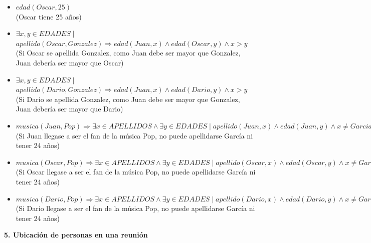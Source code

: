 \documentclass[12pt]{article}
\begin{document}
\begin{itemize}
\begin{itemize}
\item $edad(Oscar, 25)$ \\ (Oscar tiene 25 años)
\item $\exists x,y \in EDADES \mid$ \\ $ apellido(Oscar, Gonzalez) \Rightarrow edad(Juan,x) \land edad(Oscar,y) \land x > y$ \\ (Si Oscar se apellida Gonzalez, como Juan debe ser mayor que Gonzalez, Juan debería ser mayor que Oscar)
\item $\exists x,y \in EDADES \mid$ \\ $ apellido(Dario, Gonzalez) \Rightarrow edad(Juan,x) \land edad(Dario,y) \land x > y$ \\ (Si Dario se apellida Gonzalez, como Juan debe ser mayor que Gonzalez, Juan debería ser mayor que Dario)
\item $musica(Juan, Pop) \Rightarrow \exists x \in APELLIDOS \land \exists y \in EDADES \mid apellido(Juan, x) \land edad(Juan, y) \land x \neq Garcia \land y \neq 24$ \\
(Si Juan llegase a ser el fan de la música Pop, no puede apellidarse García ni tener 24 años)
\item $musica(Oscar, Pop) \Rightarrow \exists x \in APELLIDOS \land \exists y \in EDADES \mid apellido(Oscar, x) \land edad(Oscar, y) \land x \neq Garcia \land y \neq 24$ \\
(Si Oscar llegase a ser el fan de la música Pop, no puede apellidarse García ni tener 24 años)
\item $musica(Dario, Pop) \Rightarrow \exists x \in APELLIDOS \land \exists y \in EDADES \mid apellido(Dario, x) \land edad(Dario, y) \land x \neq Garcia \land y \neq 24$ \\
(Si Dario llegase a ser el fan de la música Pop, no puede apellidarse García ni tener 24 años)
\end{itemize}
\end{itemize}

\newpage

\begin{flushleft}
\textbf{5. Ubicación de personas en una reunión}
\end{flushleft}
\end{document}
